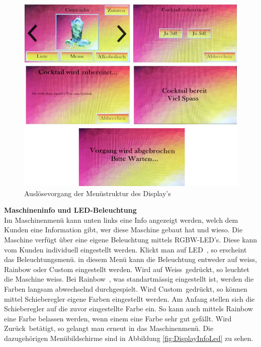 \begin{figure}[H]
	\centering
	\includegraphics[width=\textwidth]{graphics/DisplayAusloesen}
	\caption{Auslösevorgang der Menüstruktur des Display's \cite{pngimgcom_cocktail_nodate-6}}
	\label{fig:DisplayAusloesen}
\end{figure}

\newpage

\textbf{Maschineninfo und LED-Beleuchtung}\\
Im Maschinenmenü kann unten links eine Info angezeigt werden, welch dem Kunden eine Information gibt, wer diese Maschine gebaut hat und wieso. Die Maschine verfügt über eine eigene Beleuchtung mittels RGBW-LED's. Diese kann vom Kunden individuell eingestellt werden. Klickt man auf \flqq LED\frqq~, so erscheint das Beleuchtungsmenü. in diesem Menü kann die Beleuchtung entweder auf weiss, Rainbow oder Custom eingestellt werden. Wird auf \flqq Weiss\frqq~gedrückt, so leuchtet die Maschine weiss. Bei \flqq Rainbow\frqq~, was standartmässig eingestellt ist, werden die Farben langsam abwechselnd durchgespielt. Wird \flqq Custom\frqq~gedrückt, so können mittel Schieberegler eigene Farben eingestellt werden. Am Anfang stellen sich die Schieberegler auf die zuvor eingestellte Farbe ein. So kann auch mittels Rainbow eine Farbe belassen werden, wenn einem eine Farbe sehr gut gefällt. Wird \flqq Zurück\frqq~betätigt, so gelangt man erneut in das Maschinenmenü. Die dazugehörigen Menübildschirme sind in Abbildung \ref{fig:DisplayInfoLed} zu sehen.

